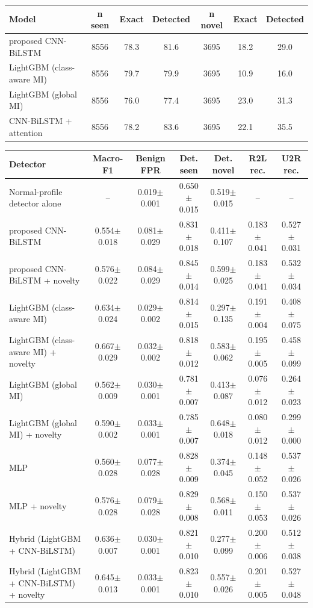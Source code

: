 \begin{tabular}{lcccccc}
\toprule
Model & n seen & Exact & Detected & n novel & Exact & Detected \\
\midrule
proposed CNN-BiLSTM & 8556 & 78.3 & 81.6 & 3695 & 18.2 & 29.0 \\
LightGBM (class-aware MI) & 8556 & 79.7 & 79.9 & 3695 & 10.9 & 16.0 \\
LightGBM (global MI) & 8556 & 76.0 & 77.4 & 3695 & 23.0 & 31.3 \\
CNN-BiLSTM + attention & 8556 & 78.2 & 83.6 & 3695 & 22.1 & 35.5 \\
\bottomrule
\end{tabular}

\begin{tabular}{lcccccc}
\toprule
Detector & Macro-F1 & Benign FPR & Det. seen & Det. novel & R2L rec. & U2R rec. \\
\midrule
Normal-profile detector alone & -- & 0.019$\pm$0.001 & 0.650$\pm$0.015 & 0.519$\pm$0.015 & -- & -- \\
proposed CNN-BiLSTM & 0.554$\pm$0.018 & 0.081$\pm$0.029 & 0.831$\pm$0.018 & 0.411$\pm$0.107 & 0.183$\pm$0.041 & 0.527$\pm$0.031 \\
proposed CNN-BiLSTM + novelty & 0.576$\pm$0.022 & 0.084$\pm$0.029 & 0.845$\pm$0.014 & 0.599$\pm$0.025 & 0.183$\pm$0.041 & 0.532$\pm$0.034 \\
LightGBM (class-aware MI) & 0.634$\pm$0.024 & 0.029$\pm$0.002 & 0.814$\pm$0.015 & 0.297$\pm$0.135 & 0.191$\pm$0.004 & 0.408$\pm$0.075 \\
LightGBM (class-aware MI) + novelty & 0.667$\pm$0.029 & 0.032$\pm$0.002 & 0.818$\pm$0.012 & 0.583$\pm$0.062 & 0.195$\pm$0.005 & 0.458$\pm$0.099 \\
LightGBM (global MI) & 0.562$\pm$0.009 & 0.030$\pm$0.001 & 0.781$\pm$0.007 & 0.413$\pm$0.087 & 0.076$\pm$0.012 & 0.264$\pm$0.023 \\
LightGBM (global MI) + novelty & 0.590$\pm$0.002 & 0.033$\pm$0.001 & 0.785$\pm$0.007 & 0.648$\pm$0.018 & 0.080$\pm$0.012 & 0.299$\pm$0.000 \\
MLP & 0.560$\pm$0.028 & 0.077$\pm$0.028 & 0.828$\pm$0.009 & 0.374$\pm$0.045 & 0.148$\pm$0.052 & 0.537$\pm$0.026 \\
MLP + novelty & 0.576$\pm$0.028 & 0.079$\pm$0.028 & 0.829$\pm$0.008 & 0.568$\pm$0.011 & 0.150$\pm$0.053 & 0.537$\pm$0.026 \\
Hybrid (LightGBM + CNN-BiLSTM) & 0.636$\pm$0.007 & 0.030$\pm$0.001 & 0.821$\pm$0.010 & 0.277$\pm$0.099 & 0.200$\pm$0.006 & 0.512$\pm$0.038 \\
Hybrid (LightGBM + CNN-BiLSTM) + novelty & 0.645$\pm$0.013 & 0.033$\pm$0.001 & 0.823$\pm$0.010 & 0.557$\pm$0.026 & 0.201$\pm$0.005 & 0.527$\pm$0.048 \\
\bottomrule
\end{tabular}

